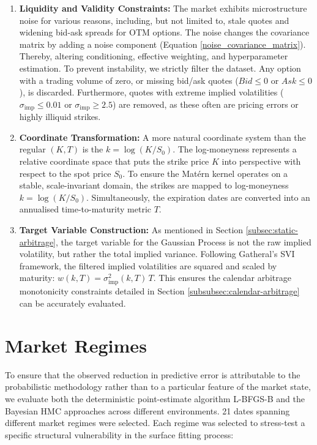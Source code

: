 \documentclass[12pt,oneside]{report}
\theoremstyle{definition}
\theoremstyle{remark}
\begin{document}
\begin{enumerate}
    \item \textbf{Liquidity and Validity Constraints:} 
    The market exhibits microstructure noise for various reasons, including, but not limited to, stale quotes and widening bid-ask spreads for OTM options. The noise changes the covariance matrix by adding a noise component (Equation \ref{noise_covariance_matrix}). Thereby, altering conditioning, effective weighting, and hyperparameter estimation. To prevent instability, we strictly filter the dataset. Any option with a trading volume of zero, or missing bid/ask quotes ($Bid \le 0$ or $Ask \le 0$), is discarded. Furthermore, quotes with extreme implied volatilities ($\sigma_{\text{imp}} \le 0.01$ or $\sigma_{\text{imp}} \ge 2.5$) are removed, as these often are pricing errors or highly illiquid strikes.
    \item \textbf{Coordinate Transformation:} 
    A more natural coordinate system than the regular $(K,T)$ is the $k = \log(K/S_0)$. The log-moneyness represents a relative coordinate space that puts the strike price $K$ into perspective with respect to the spot price $S_0$. To ensure the Matérn kernel operates on a stable, scale-invariant domain, the strikes are mapped to log-moneyness $k = \log(K/S_0)$. Simultaneously, the expiration dates are converted into an annualised time-to-maturity metric $T$.
    \item \textbf{Target Variable Construction:} 
    As mentioned in Section \ref{subsec:static-arbitrage}, the target variable for the Gaussian Process is not the raw implied volatility, but rather the total implied variance. Following Gatheral's SVI framework, the filtered implied volatilities are squared and scaled by maturity: $w(k,T) = \sigma_{\text{imp}}^2(k,T) \, T$. This ensures the calendar arbitrage monotonicity constraints detailed in Section \ref{subsubsec:calendar-arbitrage} can be accurately evaluated.
\end{enumerate}

\section{Market Regimes}
\label{sec:market-regimes}
To ensure that the observed reduction in predictive error is attributable to the probabilistic methodology rather than to a particular feature of the market state, we evaluate both the deterministic point-estimate algorithm L-BFGS-B and the Bayesian HMC approaches across different environments. 21 dates spanning different market regimes were selected. Each regime was selected to stress-test a specific structural vulnerability in the surface fitting process:
\end{document}

